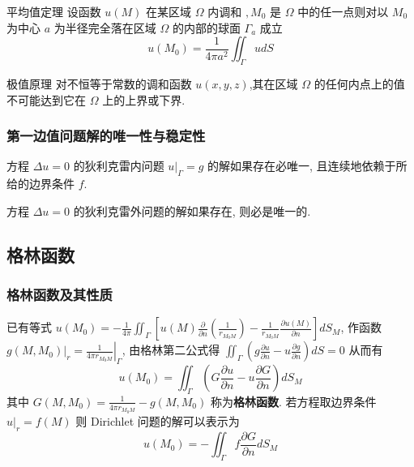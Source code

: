 \documentclass[10pt]{yerbaformat}
\begin{document}
\begin{theorem}{平均值定理}
    设函数 $u(M)$ 在某区域 $\Omega$ 内调和 $, M_{0}$ 是 $\Omega$ 中的任一点则对以 $M_{0}$ 为中心 $a$ 为半径完全落在区域 $\Omega$ 的内部的球面 $\Gamma_{a}$ 成立 $$ u\left(M_{0}\right)=\frac{1}{4 \pi a^{2}} \iint_{\Gamma} u d S $$
\end{theorem}

\begin{theorem}{极值原理}
    对不恒等于常数的调和函数 $u(x, y, z)$,其在区域 $\Omega$ 的任何内点上的值不可能达到它在 $\Omega$ 上的上界或下界.
\end{theorem}

\subsubsection{第一边值问题解的唯一性与稳定性}
\begin{theorem}
    方程 $\Delta u =0$ 的狄利克雷内问题 $\left.u\right|_{\Gamma}=g$ 的解如果存在必唯一, 且连续地依赖于所给的边界条件 $f$.
\end{theorem}

\begin{theorem} 
    方程 $\Delta u =0$ 的狄利克雷外问题的解如果存在, 则必是唯一的.
\end{theorem}

\subsection{格林函数}

\subsubsection{格林函数及其性质}
\par 已有等式 $u\left(M_{0}\right)=-\frac{1}{4 \pi} \iint_{\Gamma}\left[u(M) \frac{\partial}{\partial n}\left(\frac{1}{r_{M_{0} M}}\right)-\frac{1}{r_{M_{0} M}} \frac{\partial u(M)}{\partial n}\right] d S_{M}$, 作函数 $\left.g\left(M, M_{0}\right)\right|_{r}=\left.\frac{1}{4 \pi r_{M_{0} M}}\right|_{\Gamma}$, 由格林第二公式得 $\iint_{\Gamma}\left(g \frac{\partial u}{\partial n}-u \frac{\partial g}{\partial n}\right) d S=0$ 从而有 $$u\left(M_{0}\right)=\iint_{\Gamma}\left(G \frac{\partial u}{\partial n}-u \frac{\partial G}{\partial n}\right) d S_{M} $$ 其中 $G\left(M, M_{0}\right)=\frac{1}{4 \pi r_{M_{0} M}}-g\left(M, M_{0}\right)$ 称为\textbf{格林函数}. 若方程取边界条件 $\left.u\right|_{r}=f(M)$ 则 Dirichlet 问题的解可以表示为 $$u\left(M_{0}\right)=-\iint_{\Gamma} f \frac{\partial G}{\partial n} d S_{M}$$
\end{document}
